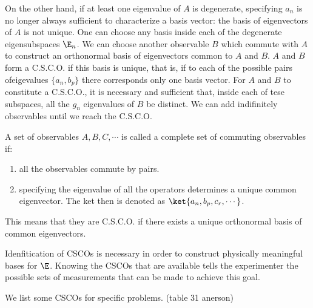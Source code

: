 On the other hand, if at least one eigenvalue of $A$ is degenerate, specifying $a_n$ is no longer always sufficient to characterize a basis vector:
the basis of eigenvectors of $A$ is not unique. One can choose any basis inside each of the degenerate eigensubspaces $\E_n$.
We can choose another observable $B$ which commute with $A$ to construct an orthonormal basis of eigenvectors common to $A$ and $B$.
$A$ and $B$ form a C.S.C.O. if this basis is unique, that is, if to each of the possible pairs ofeigevalues $\{a_n,b_p\}$ there corresponds only one basis vector.
For $A$ and $B$ to constitute a C.S.C.O., it is necessary and sufficient that, inside each of tese subspaces, all the $g_n$ eigenvalues of $B$ be distinct.
We can add indifinitely observables until we reach the C.S.C.O.

\begin{emphasizer}
    A set of observables $A,B,C,\cdots$ is called a complete set of commuting observables if:
    \begin{enumerate}[itemsep=0pt,topsep=0pt,label=(\roman*)]
        \item all the observables commute by pairs.
        \item specifying the eigenvalue of all the operators determines a unique common eigenvector. The ket then is denoted as $\ket{a_n,b_p,c_r,\cdots}$.
    \end{enumerate}
    This means that they are C.S.C.O. if there exists a unique orthonormal basis of common eigenvectors. 
\end{emphasizer}
Idenfitication of CSCOs is necessary in order to construct physically meaningful bases for $\E$. Knowing the CSCOs that are available tells the experimenter the possible sets 
of measurements that can be made to achieve this goal. 

We list some CSCOs for specific problems. (table 31 anerson)